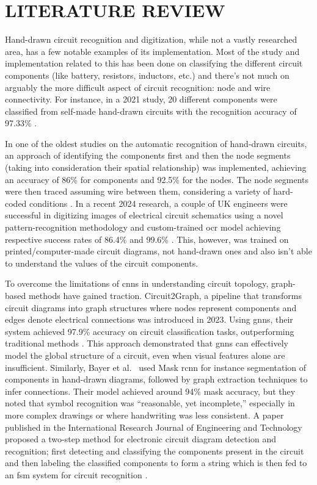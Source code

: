 \chapter{LITERATURE REVIEW}

Hand-drawn circuit recognition and digitization, while not a vastly researched area, has a few notable examples of its implementation. Most of the study and implementation related to this has been done on classifying the different circuit components (like battery, resistors, inductors, etc.) and there's not much on arguably the more difficult aspect of circuit recognition: node and wire connectivity. For instance, in a 2021 study, 20 different components were classified from self-made hand-drawn circuits with the recognition accuracy of 97.33\% \cite{adnan2021cnnbased}.

In one of the oldest studies on the automatic recognition of hand-drawn circuits, an approach of identifying the components first and then the node segments (taking into consideration their spatial relationship) was implemented, achieving an accuracy of 86\% for components and 92.5\% for the nodes. The node segments were then traced assuming wire between them, considering a variety of hard-coded conditions \cite{edwards2000machine}. In a recent 2024 research, a couple of UK engineers were successful in digitizing images of electrical circuit schematics using a novel pattern-recognition methodology and custom-trained \gls{ocr} model achieving respective success rates of 86.4\% and 99.6\% \cite{kelly2024digitizing}. This, however, was trained on printed/computer-made circuit diagrams, not hand-drawn ones and also isn't able to understand the values of the circuit components.

To overcome the limitations of \glspl{cnn} in understanding circuit topology, graph-based methods have gained traction. Circuit2Graph, a pipeline that transforms circuit diagrams into graph structures where nodes represent components and edges denote electrical connections was introduced in 2023. Using \glspl{gnn}, their system achieved 97.9\% accuracy on circuit classification tasks, outperforming traditional methods \cite{yamakaji2023circuit2graph}. This approach demonstrated that \glspl{gnn} can effectively model the global structure of a circuit, even when visual features alone are insufficient. Similarly, Bayer et al.\ \cite{bayer2023instance} used Mask \gls{rcnn} for instance segmentation of components in hand-drawn diagrams, followed by graph extraction techniques to infer connections. Their model achieved around 94\% mask accuracy, but they noted that symbol recognition was ``reasonable, yet incomplete,'' especially in more complex drawings or where handwriting was less consistent. A paper published in the International Research Journal of Engineering and Technology proposed a two-step method for electronic circuit diagram detection and recognition; first detecting and classifying the components present in the circuit and then labeling the classified components to form a string which is then fed to an \gls{fsm} system for circuit recognition \cite{abhinav2020electric}.

